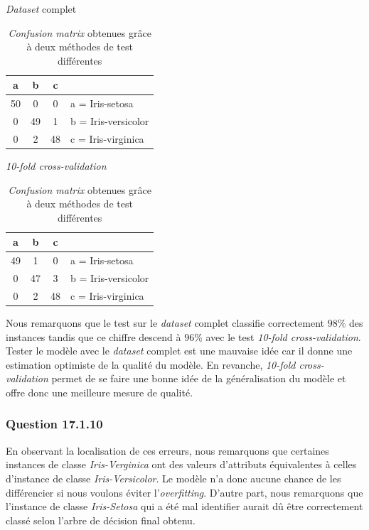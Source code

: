 \documentclass[10pt,a4paper]{article}
\begin{document}
	   			\begin{table}[h]
	   				\centering
					\begin{subtable}{0.4\textwidth}
						\centering
						\caption{\textit{Dataset} complet}
						\begin{tabular}{|c|c|c|l|}
							\hline
							a & b & c & \\ 
							\hline
							50 & 0 & 0 & a = Iris-setosa\\
							\hline
							0 & 49 & 1 & b = Iris-versicolor\\
							\hline
							0 & 2 & 48 & c = Iris-virginica\\
							\hline
						\end{tabular}
					\end{subtable}%
					\begin{subtable}{0.4\textwidth}
						\centering
						\caption{\textit{10-fold cross-validation}}
						\begin{tabular}{|c|c|c|l|}
							\hline
							a & b & c & \\ 
							\hline
							49 & 1 & 0 & a = Iris-setosa\\
							\hline
							0 & 47 & 3 & b = Iris-versicolor\\
							\hline
							0 & 2 & 48 & c = Iris-virginica\\
							\hline
						\end{tabular}
					\end{subtable}
					\caption{\textit{Confusion matrix} obtenues grâce à deux méthodes de test différentes}
	   			\end{table}
 
				 Nous remarquons que le test sur le \textit{dataset} complet classifie correctement $98\%$ des instances tandis que ce chiffre descend à $96\%$ avec le test \textit{10-fold cross-validation}. Tester le modèle avec le \textit{dataset} complet est une mauvaise idée car il donne une estimation optimiste de la qualité du modèle. En revanche, \textit{10-fold cross-validation} permet de se faire une bonne idée de la généralisation du modèle et offre donc une meilleure mesure de qualité.
				 
			\subsubsection*{Question 17.1.10}
			
				En observant la localisation de ces erreurs, nous remarquons que certaines instances de classe \textit{Iris-Verginica} ont des valeurs d'attributs équivalentes à celles d'instance de classe \textit{Iris-Versicolor}. Le modèle n'a donc aucune chance de les différencier si nous voulons éviter l'\textit{overfitting}. D'autre part, nous remarquons que l'instance de classe \textit{Iris-Setosa} qui a été mal identifier aurait dû être correctement classé selon l'arbre de décision final obtenu. 
		
\end{document}
